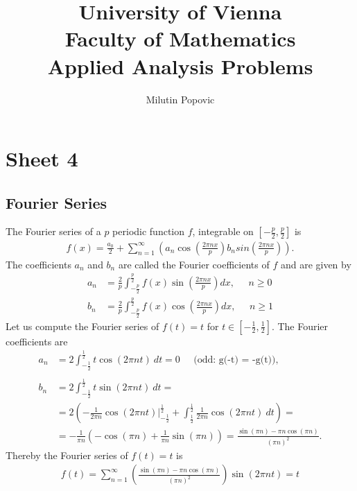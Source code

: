 \documentclass[a4paper]{article}
\title{University of Vienna\\ Faculty of Mathematics\\
\vspace{1cm}Applied Analysis Problems
}
\author{Milutin Popovic}
\begin{document}
\maketitle
\tableofcontents

\section{Sheet 4}

\subsection{Fourier Series}
The Fourier series of a $p$ periodic function $f$, integrable on
$[-\frac{p}{2}, \frac{p}{2}]$ is
\begin{align}
    f(x) = \frac{a_0}{2} + \sum_{n=1}^\infty \left(a_n \cos(\frac{2\pi n x}{p})
    b_n sin(\frac{2\pi n x}{p})\right).
\end{align}
The coefficients $a_n$ and $b_n$ are called the Fourier coefficients of $f$
and are given by
\begin{align}
    a_n &= \frac{2}{p} \int_{-\frac{p}{2}}^{\frac{p}{2}} f(x) \sin(\frac{2\pi
    n x}{p}) dx, \;\;\;\;\; n\geq 0 \\
    b_n &= \frac{2}{p} \int_{-\frac{p}{2}}^{\frac{p}{2}} f(x) \cos(\frac{2\pi
    n x}{p}) dx, \;\;\;\;\; n\geq 1
\end{align}
Let us compute the Fourier series of $f(t) = t$ for $t \in [-\frac{1}{2},
\frac{1}{2}]$. The Fourier coefficients are
\begin{align}
    a_n &= 2\int_{-\frac{1}{2}}^{\frac{1}{2}} t \cos(2\pi n t)\ dt = 0
    \;\;\;\;\; \text{(odd: g(-t) = -g(t))},\\
    \nonumber\\
    b_n &= 2\int_{-\frac{1}{2}}^{\frac{1}{2}} t \sin(2\pi n t)\ dt = \\
        &= 2 \left(-\frac{1}{2\pi n} \cos(2\pi n
        t)\bigg|_{-\frac{1}{2}}^{\frac{1}{2}}
        +\int_{\frac{1}{2}}^{\frac{1}{2}} \frac{1}{2 \pi n}\cos(2\pi n t)\ dt
            \right) =\\
        &= -\frac{1}{\pi n}\left( -\cos(\pi n) + \frac{1}{\pi n }\sin(\pi
            n)\right) =
        \frac{\sin(\pi n) - \pi n \cos(\pi n)}{(\pi n)^2}.
\end{align}
Thereby the Fourier series of $f(t) = t$ is
\begin{align}
    f(t) = \sum_{n=1}^\infty \left(\frac{\sin(\pi n) - \pi n \cos(\pi n)}{(\pi
    n)^2}\right) \sin(2\pi n t) = t
\end{align}
\end{document}
